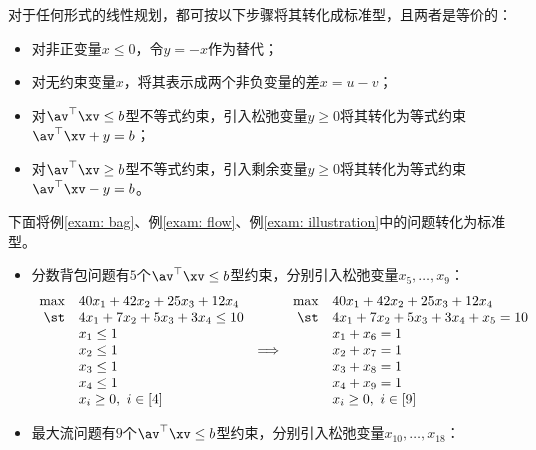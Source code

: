 \documentclass{ctexart}
\begin{document}
对于任何形式的线性规划，都可按以下步骤将其转化成标准型，且两者是等价的：
\begin{itemize}
    \item 对非正变量$x \le 0$，令$y = -x$作为替代；
    \item 对无约束变量$x$，将其表示成两个非负变量的差$x = u - v$；
    \item 对$\av^\top \xv \le b$型不等式约束，引入松弛变量$y \ge 0$将其转化为等式约束$\av^\top \xv + y = b$；
    \item 对$\av^\top \xv \ge b$型不等式约束，引入剩余变量$y \ge 0$将其转化为等式约束$\av^\top \xv - y = b$。
\end{itemize}

下面将例\ref{exam: bag}、例\ref{exam: flow}、例\ref{exam: illustration}中的问题转化为标准型。

\begin{itemize}
    \item 分数背包问题有$5$个$\av^\top \xv \le b$型约束，分别引入松弛变量$x_5, \ldots, x_9$：
          \begin{align}
              \begin{array}{rlcrl} \label{eq: bag-standard}
                  \max & 40 x_1 + 42 x_2 + 25 x_3 + 12 x_4    &                 & \max & 40 x_1 + 42 x_2 + 25 x_3 + 12 x_4        \\
                  \st  & 4 x_1 + 7 x_2 + 5 x_3 + 3 x_4 \le 10 &                 & \st  & 4 x_1 + 7 x_2 + 5 x_3 + 3 x_4 + x_5 = 10 \\
                       & x_1 \le 1                            &                 &      & x_1 + x_6 = 1                            \\
                       & x_2 \le 1                            & \Longrightarrow &      & x_2 + x_7 = 1                            \\
                       & x_3 \le 1                            &                 &      & x_3 + x_8 = 1                            \\
                       & x_4 \le 1                            &                 &      & x_4 + x_9 = 1                            \\
                       & x_i \ge 0, ~ i \in [4]               &                 &      & x_i \ge 0, ~ i \in [9]
              \end{array}
          \end{align}
    \item 最大流问题有$9$个$\av^\top \xv \le b$型约束，分别引入松弛变量$x_{10}, \ldots, x_{18}$：

\end{itemize}
\end{document}

